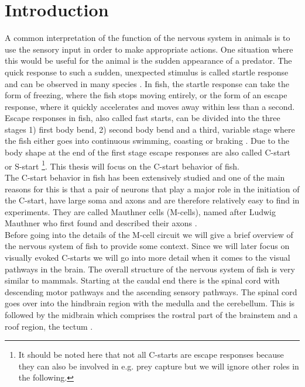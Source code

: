 \documentclass[a4paper,10pt,hidelinks]{scrreprt}
\begin{document}
	\chapter{Introduction}
	A common interpretation of the function of the nervous system in animals is to use the sensory 
	input in order to make appropriate actions.
	One situation where this would be useful for the animal is the sudden appearance of a predator.
	The quick response to such a sudden, unexpected stimulus is called startle response and can be 
	observed in many species \citep{Eaton1984a}.
	In fish, the startle response can take the form of freezing, where the fish	stops moving 
	entirely, or the form of an escape response, where it quickly accelerates and moves away within 
	less than a second.
	Escape responses in fish, also called fast starts, can be divided into the three stages 1) 
	first body bend, 2) second body bend and a third, variable stage where the fish either goes 
	into continuous swimming, coasting or braking \citep{Domenici2011}.
	Due to the body shape at the end of the first stage escape responses are also called C-start or 
	S-start \citep{Domenici2011}\footnote{It should be noted here that not all C-starts are escape 
	responses because they can also be involved in e.g. prey capture but we will ignore other roles 
	in the following.}.
	This thesis will focus on the C-start behavior of fish.\\
	The C-start behavior in fish has been extensively studied and one of the main reasons for this 
	is that a pair of neurons that play a major role in the initiation of the C-start, have large 
	soma and axons and are therefore relatively easy to find in experiments.
	They are called Mauthner cells (M-cells), named after Ludwig Mauthner who first found and 
	described their axons \citep{Mauthner1859}.\\
	Before going into the details of the M-cell circuit we will give a brief overview of the 
	nervous 
	system of fish to provide some context.
	Since we will later focus on visually evoked C-starts we will go into more detail when it comes 
	to the visual pathways in the brain.
	The overall structure of the nervous system of fish is very similar to mammals.
	Starting at the caudal end there is the spinal cord with descending motor pathways and the 
	ascending sensory pathways.
	The spinal cord goes over into the hindbrain region with the medulla and the cerebellum.
	This is followed by the midbrain which comprises the rostral part of the brainstem and a roof 
	region, the tectum \cite{the chapter in encyclopedia of fish physiology}.
\end{document}
